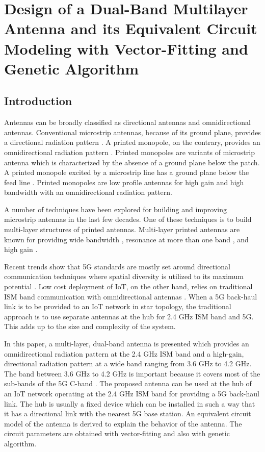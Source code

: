 \chapter{Design of a Dual-Band Multilayer Antenna and its Equivalent Circuit Modeling with Vector-Fitting and Genetic Algorithm}
\label{chap:chap4}
\section{Introduction}\label{intro}
Antennas can be broadly classified as directional antennas and omnidirectional antennas. Conventional microstrip antennas, because of its ground plane, provides a directional radiation pattern \cite{handbook}. A printed monopole, on the contrary, provides an omnidirectional radiation pattern \cite{pma_stripline, pma_dualband}. Printed monopoles are variants of microstrip antenna which is characterized by the absence of a ground plane below the patch. A printed monopole excited by a microstrip line has a ground plane below the feed line \cite{pma_stripline}. Printed monopoles are low profile antennas for high gain and high bandwidth with an omnidirectional radiation pattern\cite{PMA01}.

A number of techniques have been explored for building and improving microstrip antennas in the last few decades. One of these techniques is to build multi-layer structures of printed antennas. Multi-layer printed antennas are known for providing wide bandwidth \cite{ML_WideBand01}, resonance at more than one band \cite{ML_DualBand01, ML_DualBand02}, and high gain \cite{ML_high_gain_parasitic_slot}.

Recent trends show that 5G standards are mostly set around directional communication techniques where spatial diversity is utilized to its maximum potential \cite{5G_surv1, 5G_surv2}. Low cost deployment of IoT, on the other hand, relies on traditional ISM band communication with omnidirectional antennas \cite{iot-ant1,iot-ant2,iot-ant3}. When a 5G back-haul link is to be provided to an IoT network in star topology, the traditional approach is to use separate antennas at the hub for 2.4 GHz ISM band and 5G. This adds up to the size and complexity of the system.

In this paper, a multi-layer, dual-band antenna is presented which provides an omnidirectional radiation pattern at the 2.4 GHz ISM band and a high-gain, directional radiation pattern at a wide band ranging from 3.6 GHz to 4.2 GHz. The band between 3.6 GHz to 4.2 GHz is important because it covers most of the sub-bands of the 5G C-band \cite{5G_tutorial, 5G_standards}. The proposed antenna can be used at the hub of an IoT network operating at the 2.4 GHz ISM band for providing a 5G back-haul link. The hub is usually a fixed device which can be installed in such a way that it has a directional link with the nearest 5G base station. An equivalent circuit model of the antenna is derived to explain the behavior of the antenna. The circuit parameters are obtained with vector-fitting and also with genetic algorithm.


